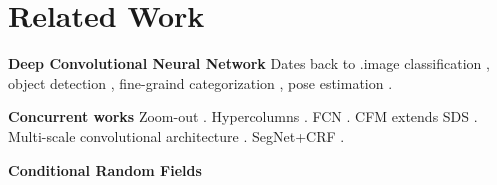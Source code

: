 \section{Related Work}
{\bf{Deep Convolutional Neural Network}} Dates back to \citet{LeCun1998}.image classification \citet{KrizhevskyNIPS2013, papandreou2014untangling, sermanet2013overfeat, simonyan2014very, szegedy2014going}, object detection \citet{girshick2014rcnn}, fine-graind categorization \citet{zhang2014part}, pose estimation \citet{chen2014articulated, tompson2014joint}.

{\bf{Concurrent works}} Zoom-out \citet{mostajabi2014feedforward}. Hypercolumns \citet{hariharan2014hypercolumns}. FCN \citet{long2014fully}. CFM \citet{dai2014convolutional} extends SDS \citet{hariharan2014simultaneous}. Multi-scale convolutional architecture \citet{eigen2014predicting}. SegNet+CRF \citet{cogswell2014combining}.

{\bf{Conditional Random Fields}} \citet{delong2012fast, kohli2009robust, krahenbuhl2011efficient, ladicky2009associative, lucchi2011spatial, rother2004grabcut}
